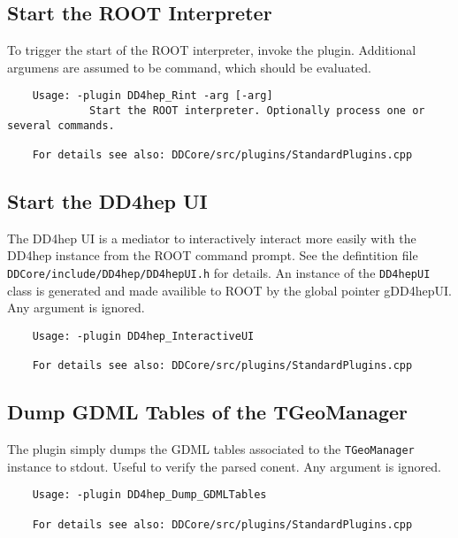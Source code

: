 \subsection{Start the ROOT Interpreter}
\label{sec:dd4hep-manual-plugin-root-interpreter}

To trigger the start of the ROOT interpreter, invoke the plugin. Additional argumens are 
assumed to be command, which should be evaluated.
\begin{verbatim}
    Usage: -plugin DD4hep_Rint -arg [-arg]                                 
             Start the ROOT interpreter. Optionally process one or several commands.

    For details see also: DDCore/src/plugins/StandardPlugins.cpp
\end{verbatim}

\subsection{Start the DD4hep UI}
\label{sec:dd4hep-manual-plugin-dd4hep-ui}

The DD4hep UI is a mediator to interactively interact more easily with the DD4hep instance from the 
ROOT command prompt. See the defintition file \texttt{DDCore/include/DD4hep/DD4hepUI.h} for details.
An instance of the \texttt{DD4hepUI} class is generated and made availible to ROOT by the global pointer
gDD4hepUI. Any argument is ignored.
\begin{verbatim}
    Usage: -plugin DD4hep_InteractiveUI

    For details see also: DDCore/src/plugins/StandardPlugins.cpp
\end{verbatim}

\subsection{Dump GDML Tables of the TGeoManager}
\label{sec:dd4hep-manual-plugin-dump-gdml-tables}

The plugin simply dumps the GDML tables associated to the \texttt{TGeoManager} instance to stdout.
Useful to verify the parsed conent.
Any argument is ignored.
\begin{verbatim}
    Usage: -plugin DD4hep_Dump_GDMLTables

    For details see also: DDCore/src/plugins/StandardPlugins.cpp
\end{verbatim}

